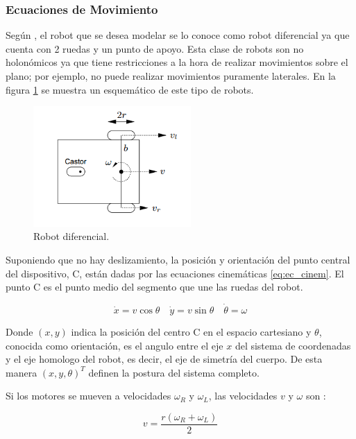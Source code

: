 \documentclass[10pt,conference,a4paper,onecolumn]{article}%
\begin{document}
\subsubsection{Ecuaciones de Movimiento}
Según \cite{pathfoll}, el robot que se desea modelar se lo conoce como robot diferencial ya que cuenta con 2 ruedas y un punto de apoyo. Esta clase de robots son no holonómicos ya que tiene restricciones a la hora de realizar movimientos sobre el plano; por ejemplo, no puede realizar movimientos puramente laterales. En la figura \ref{fig:robot_diferencial} se muestra un esquemático de este tipo de robots.
\begin{figure}[h]
\centering
\includegraphics[width=6cm]{./imagenes/robot_diferencial.png}
\caption{Robot diferencial. }%
\label{fig:robot_diferencial}
\end{figure}

Suponiendo que no hay deslizamiento, la posición y orientación del punto central del dispositivo, C, están dadas por las ecuaciones cinemáticas \ref{eq:ec_cinem}. El punto C es el punto medio del segmento que une las ruedas del robot.

\begin{equation}
\dot{x}=v\cos\theta \quad \dot{y}=v\sin\theta \quad \dot{\theta}=\omega
\label{eq:ec_cinem}
\end{equation}

Donde $(x,y)$ indica la posición del centro C en el espacio cartesiano y $\theta $, conocida como orientación, es el angulo entre el eje $x$ del sistema de coordenadas y el eje homologo del robot, es decir, el eje de simetría del cuerpo.  De esta manera $(x,y,\theta)^T$ definen la postura del sistema completo.

 Si los motores se mueven a velocidades $\omega_R$ y $\omega_L$, las velocidades $v$ y $\omega$ son \cite{planning}:

\begin{equation*}
v=\frac{r(\omega _R + \omega _L)}{2}
\end{equation*}
\end{document}
